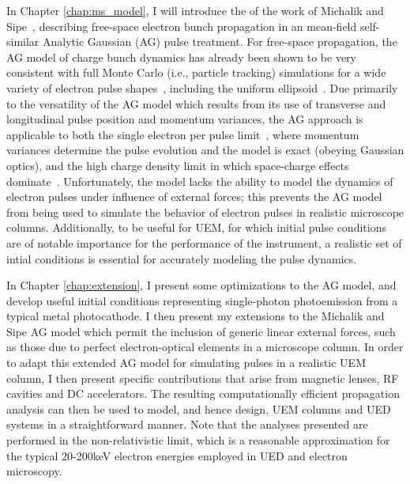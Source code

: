 In Chapter \ref{chap:ms_model}, I will introduce the of the work of Michalik and Sipe~\cite{michalik_analytic_2006,michalik_erratum:_2008}, describing free-space electron bunch propagation in an mean-field self-similar Analytic Gaussian (AG) pulse treatment.
For free-space propagation, the AG model of charge bunch dynamics has already been shown to be very consistent with full Monte Carlo (i.e., particle tracking) simulations for a wide variety of electron pulse shapes~\cite{michalik_analytic_2006,michalik_evolution_2009}, including the uniform ellipsoid~\cite{luiten_how_2004}.
Due primarily to the versatility of the AG model which results from its use of transverse and longitudinal pulse position and momentum variances, the AG approach is applicable to both the single electron per pulse limit~\cite{lobastov_four-dimensional_2005}, where momentum variances determine the pulse evolution and the model is exact (obeying Gaussian optics), and the high charge density limit in which space-charge effects dominate~\cite{luiten_how_2004,siwick_ultrafast_2002,cao_femtosecond_2003}.
Unfortunately, the model lacks the ability to model the dynamics of electron pulses under influence of external forces; this prevents the AG model from being used to simulate the behavior of electron pulses in realistic microscope columns.
Additionally, to be useful for UEM, for which initial pulse conditions are of notable importance for the performance of the instrument, a realistic set of intial conditions is essential for accurately modeling the pulse dynamics.

In Chapter \ref{chap:extension}, I present some optimizations to the AG model, and develop useful initial conditions representing single-photon photoemission from a typical metal photocathode.
I then present my extensions to the Michalik and Sipe AG model which permit the inclusion of generic linear external forces, such as those due to perfect electron-optical elements in a microscope column.
In order to adapt this extended AG model for simulating pulses in a realistic UEM column, I then present specific contributions that arise from magnetic lenses, RF cavities and DC accelerators.
The resulting computationally efficient propagation analysis can then be used to model, and hence design, UEM columns and UED systems in a straightforward manner.
Note that the analyses presented are performed in the non-relativistic limit, which is a reasonable approximation for the typical 20-200keV electron energies employed in UED and electron microscopy.


